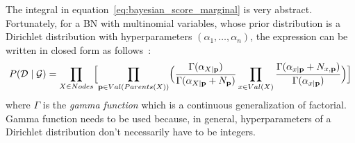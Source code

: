 \documentclass[english,cover]{fitthesis} %
\newcommand{\term}[1]{\emph{#1}}           %
\newcommand{\vars}[1]{{\bold{#1}}}         %
\begin{document}
The integral in equation~\eqref{eq:bayesian_score_marginal} is very abstract. Fortunately, for a BN with multinomial variables, whose prior distribution is a Dirichlet distribution with hyperparameters $(\alpha_1, \dots, \alpha_n)$, the expression can be written in closed form as follows~\cite[p.~796]{pgm}:
\begin{equation*}
    P(\mathcal{D} \mid \mathcal{G})
    =
     \prod_{X \in Nodes}
             \Bigl[
                \prod_{\vars{p} \in Val(Parents(X))}
                   \Bigl(
                      \frac{\Gamma(\alpha_{X \mid \vars{p}})}{\Gamma(\alpha_{X \mid \vars{p}} + N_{\vars{p}})}
                      \prod_{x \in Val(X)} \frac{\Gamma(\alpha_{x \mid \vars{p}} + N_{x, \vars{p}})}{\Gamma(\alpha_{x \mid \vars{p}})}
                   \Bigr)
             \Bigr]
\end{equation*}
where $\Gamma$ is the \term{gamma function} which is a continuous generalization of factorial. Gamma function needs to be used because, in general, hyperparameters of a Dirichlet distribution don't necessarily have to be integers.
\end{document}
